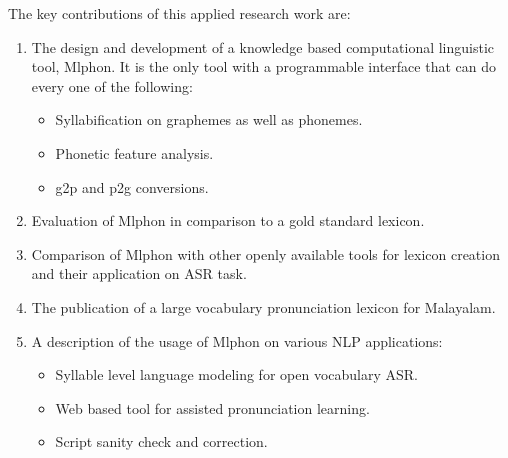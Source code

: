 \documentclass{ieeeaccess}
\begin{document}


 
The key contributions of this applied research work are:
 
 \begin{enumerate}
	\item The design and development of a knowledge based computational linguistic tool, Mlphon. It is the only tool with a programmable interface that can do every one of the following:
	      \begin{itemize}
		      \item Syllabification on graphemes as well as phonemes.
		      \item Phonetic feature analysis.
		      \item g2p and p2g conversions.
      \end{itemize}

    \item Evaluation of Mlphon in comparison to a gold standard lexicon.
    \item Comparison of Mlphon with other openly available tools for lexicon creation and their application on ASR task.
	\item The publication of a large vocabulary pronunciation lexicon for Malayalam. 
	\item A description of the usage of Mlphon on various NLP applications:
	\begin{itemize}
			 \item Syllable level language modeling for open vocabulary ASR.
    	      \item Web based tool for assisted pronunciation learning.
		      \item Script sanity check and correction.


\end{itemize}
\end{enumerate}
\end{document}
